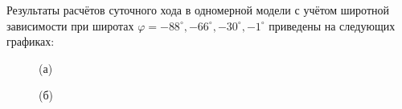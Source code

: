\documentclass[14pt, a4paper, fleqn]{extarticle}
\begin{document}
Результаты расчётов суточного хода в одномерной модели с учётом широтной зависимости при широтах $\varphi = -88^\circ, -66^\circ, -30^\circ, -1^\circ$ приведены на следующих графиках:

\vspace{2cm} 

\begin{figure}[H]
\vspace{2cm}

(а) 
\end{figure}

\begin{figure}[H]

(б)
\end{figure}
\end{document}
